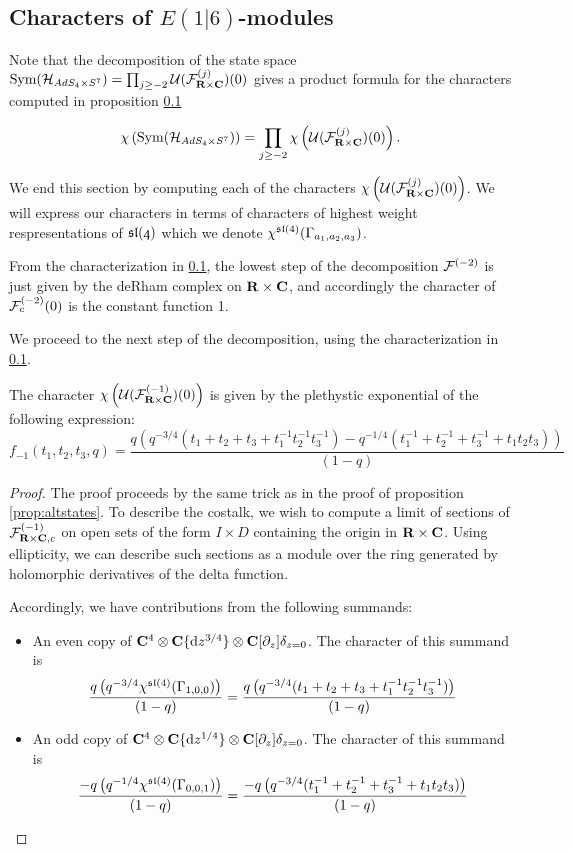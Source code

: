 \documentclass[../main.tex]{subfiles}
\begin{document}
\subsection{Characters of $E(1|6)$-modules}
Note that the decomposition of the state space $\text{Sym} (\mathcal{H}_{AdS_4\times S^7} ) = \prod_{j\geq -2} \mathcal{U} (\mathcal{F}^{(j)} _{\mathbf{R}\times \mathbf{C}} )(0)$ gives a product formula for the characters computed in proposition \ref{} 

\[\chi \left (\text{Sym} (\mathcal{H}_{AdS_4\times S^7} ) \right )= \prod_{j\geq -2} \chi \left ( \mathcal{U} (\mathcal{F}^{(j)} _{\mathbf{R}\times \mathbf{C}} )(0)\right ).\]

We end this section by computing each of the characters $\chi \left ( \mathcal{U} (\mathcal{F}^{(j)} _{\mathbf{R}\times \mathbf{C}} )(0)\right )$. We will express our characters in terms of characters of highest weight respresentations of $\mathfrak{sl(4)}$ which we denote $\chi^{\mathfrak{sl}(4)}(\Gamma_{a_1,a_2, a_3} )$.

\parsec[]
From the characterization in \ref{}, the lowest step of the decomposition $\mathcal{F}^{(-2)}$ is just given by the deRham complex on $\mathbf{R}\times \mathbf{C}$, and accordingly the character of $\mathcal{F}^{(-2)}_{c}(0)$ is the constant function 1.

\parsec[]
We proceed to the next step of the decomposition, using the characterization in \ref{}.

\begin{prop}
The character $\chi \left ( \mathcal{U}(\mathcal{F}_{\mathbf{R}\times \mathbf{C}}^{(-1)})(0)\right )$ is given by the plethystic exponential of the following expression:
\begin{equation}
f_{-1}(t_1, t_2, t_3, q) = \frac{q\left (q^{-3/4}(t_1+ t_2+t_3 + t_1^{-1} t_2^{-1} t_3^{-1} )-q^{-1/4}(t_1^{-1} + t_2^{-1}+t_3^{-1} + t_1t_2t_3)\right )}{(1-q)}
\end{equation}
\end{prop}
\begin{proof}
The proof proceeds by the same trick as in the proof of proposition \ref{prop:altstates}. To describe the costalk, we wish to compute a limit of sections of $\mathcal{F}^{(-1)}_{\mathbf{R}\times \mathbf{C},c}$ on open sets of the form $I\times D$ containing the origin in $\mathbf{R}\times \mathbf{C}$. Using ellipticity, we can describe such sections as a module over the ring generated by holomorphic derivatives of the delta function. 

Accordingly, we have contributions from the following summands:
\begin{itemize}
\item An even copy of $\mathbf{C}^4\otimes \mathbf{C}\{\mathrm{d} z^{3/4}\} \otimes \mathbf{C}[\partial_z]\delta_{z=0}$. The character of this summand is
\[
\frac{q\left (q^{-3/4}\chi^{\mathfrak{sl}(4)}(\Gamma_{1,0,0}) \right )}{(1-q)} =\frac{q\left (q^{-3/4}(t_1+ t_2+t_3 + t_1^{-1} t_2^{-1} t_3^{-1} )\right )}{(1-q)}
\]
\item An odd copy of $\mathbf{C}^4\otimes \mathbf{C}\{\mathrm{d} z^{1/4}\} \otimes \mathbf{C}[\partial_z]\delta_{z=0}$. The character of this summand is
\[
\frac{-q\left (q^{-1/4}\chi^{\mathfrak{sl}(4)}(\Gamma_{0,0,1}) \right )}{(1-q)} =\frac{-q\left (q^{-3/4}(t_1^{-1} + t_2^{-1} +t_3^{-1}  + t_1 t_2 t_3)\right )}{(1-q)}
\]
\end{itemize}
\end{proof}
\end{document}
